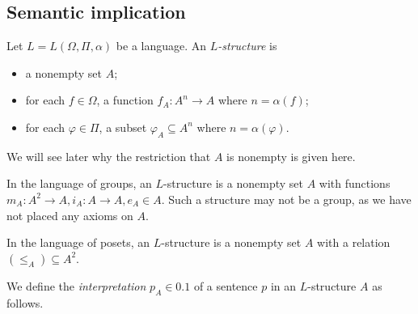 \subsection{Semantic implication}
\begin{definition}
    Let \( L = L(\Omega, \Pi, \alpha) \) be a language.
    An \emph{\( L \)-structure} is
    \begin{itemize}
        \item a nonempty set \( A \);
        \item for each \( f \in \Omega \), a function \( f_A \colon A^n \to A \) where \( n = \alpha(f) \);
        \item for each \( \varphi \in \Pi \), a subset \( \varphi_A \subseteq A^n \) where \( n = \alpha(\varphi) \).
    \end{itemize}
\end{definition}
\begin{remark}
    We will see later why the restriction that \( A \) is nonempty is given here.
\end{remark}
\begin{example}
    In the language of groups, an \( L \)-structure is a nonempty set \( A \) with functions \( m_A \colon A^2 \to A, i_A \colon A \to A, e_A \in A \).
    Such a structure may not be a group, as we have not placed any axioms on \( A \).
\end{example}
\begin{example}
    In the language of posets, an \( L \)-structure is a nonempty set \( A \) with a relation \( (\leq_A) \subseteq A^2 \).
\end{example}
We define the \emph{interpretation} \( p_A \in \qty{0,1} \) of a sentence \( p \) in an \( L \)-structure \( A \) as follows.

